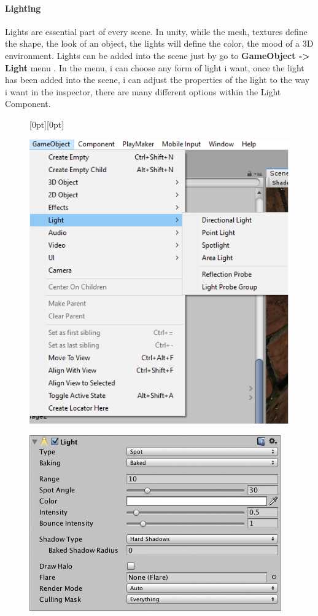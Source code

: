 \documentclass[a4paper, 13pt]{extarticle}
\begin{document}
{\paragraph{Lighting}
Lights are essential part of every scene. In unity, while the mesh, textures define the shape, the look of an object, the lights will define the color, the mood of a 3D environment. Lights can be added into the scene just by go to {\bfseries GameObject -> Light} menu . In the menu, i can choose any form of light i want, once the light has been added into the scene, i can adjust the properties of the light to the way i want in the inspector, there are many different options within the Light Component. 
\newpage
\begin{figure}[h]
	\centering
	\raisebox{-25mm}[0pt][0pt]{
		\begin{minipage}{.4\textwidth}
			\centering
			\includegraphics[width=0.8\linewidth]{intructions/choose_light.png}
			\centering
			\label{fig:test26}
		\end{minipage}
		\begin{minipage}{.45\textwidth}
			\centering
			\includegraphics[width=1.2\linewidth]{intructions/light_properties.png}

\end{minipage}}
\end{figure}}
\end{document}
